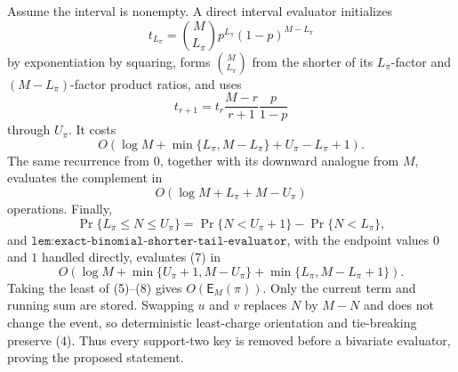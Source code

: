 Assume the interval is nonempty. A direct interval evaluator initializes
\[
t_{L_\pi}=\binom{M}{L_\pi}p^{L_\pi}(1-p)^{M-L_\pi}
\]
by exponentiation by squaring, forms \(\binom{M}{L_\pi}\) from the shorter of its \(L_\pi\)-factor and \((M-L_\pi)\)-factor product ratios, and uses
\[
t_{r+1}=t_r\frac{M-r}{r+1}\frac p{1-p}
\tag{5}
\]
through \(U_\pi\). It costs
\[
O\!\left(\log M+\min\{L_\pi,M-L_\pi\}+U_\pi-L_\pi+1\right).
\] The same recurrence from \(0\), together with its downward analogue from \(M\), evaluates the complement in
\[
O(\log M+L_\pi+M-U_\pi)
\tag{6}
\]
operations. Finally,
\[
\Pr\{L_\pi\le N\le U_\pi\}
=\Pr\{N<U_\pi+1\}-\Pr\{N<L_\pi\},
\tag{7}
\]
and \(\texttt{lem:exact-binomial-shorter-tail-evaluator}\), with the endpoint values \(0\) and \(1\) handled directly, evaluates (7) in
\[
O\!\left(\log M+\min\{U_\pi+1,M-U_\pi\}
+\min\{L_\pi,M-L_\pi+1\}\right).
\tag{8}
\]
Taking the least of (5)--(8) gives \(O(\mathsf E_M(\pi))\). Only the current term and running sum are stored. Swapping \(u\) and \(v\) replaces \(N\) by \(M-N\) and does not change the event, so deterministic least-charge orientation and tie-breaking preserve (4). Thus every support-two key is removed before a bivariate evaluator, proving the proposed statement.